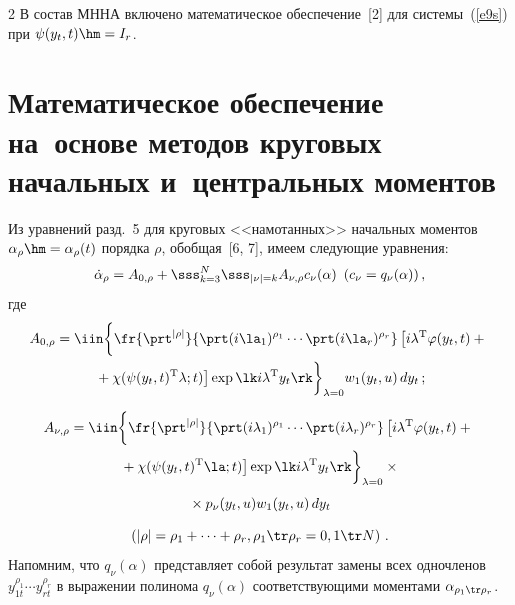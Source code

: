 \begin{multicols}{2}
В состав МННА включено математическое обеспечение~[2] для сис\-те\-мы~(\ref{e9s}) 
при $\psi (y_t, t) \hm= I_r$.

\section{Математическое обеспечение на~основе методов круговых начальных 
и~центральных моментов}

Из уравнений разд.~5 для круговых <<намотанных>> начальных моментов  
$\alpha_\rho \hm=\alpha_\rho (t)$ порядка  $\rho$, обобщая~[6, 7], имеем следующие уравнения:
\begin{equation}
\dot\alpha_\rho = A_{0,\rho} +\sss_{k=3}^N \sss_{\left\vert\nu\right\vert = 
k} A_{\nu,\rho} c_\nu (\alpha) \enskip ( c_\nu = q_\nu (\alpha))\,,\label{e21s}
\end{equation}
где
\begin{multline*}
A_{0,\rho} = \iin \biggl\{ \fr{\prt^{|\rho |}}{\prt ( i\la_1)^{\rho_1} \cdots 
\prt ( i \la_r)^{\rho_r}}
\left[ i\lambda^{\mathrm{T}} \varphi(y_t, t) +{}\right.\\ 
\left.{}+\chi (\psi(y_t, t)^{\mathrm{T}}\lambda;t)\right] \exp \lk i\lambda^{\mathrm{T}}
y_t\rk\biggr\}_{\lambda=0} 
w_1(y_t,u)\, dy_t\,;
\end{multline*}

\noindent
\begin{multline*}
A_{\nu,\rho} = \iin \biggl\{ \fr{\prt^{|\rho |}}{\prt ( i\lambda_1)^{\rho_1} \cdots 
\prt ( i \lambda_r)^{\rho_r}}
 \left[ i\lambda^{\mathrm{T}} \varphi(y_t, t) +{}\right.\\
\left. {}+ 
\chi (\psi(y_t, t)^{\mathrm{T}}\la;t)\right] \exp \lk i\lambda^{\mathrm{T}} 
y_t\rk\biggr\}_{\lambda=0} \times{}\\[4pt]
{}\times
p_\nu (y_t,u) w_1(y_t,u)\, dy_t %
\end{multline*}


\vspace*{-8pt}

\noindent
\begin{equation*}
\left(\left\vert \rho\right\vert = \rho_1 +\cdots + \rho_r , 
\rho_1 \tr \rho_r = 0,1\tr N\right)\,.
\end{equation*}
Напомним, что $q_\nu (\alpha)$ представляет собой результат замены всех 
одночленов $y_{1t}^{\rho_1} \cdots y_{rt}^{\rho_r}$ в выражении полинома  
$q_\nu (\alpha)$ соответствующими моментами $\alpha_{\rho_1\tr \rho_r}$.

\medskip


\end{multicols}

